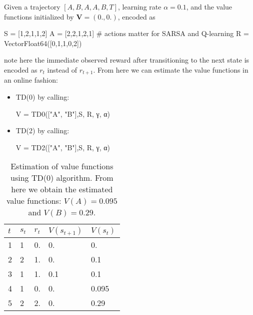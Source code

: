 \documentclass[12pt]{article}
\begin{document}
Given a trajectory $[A,B,A,A,B,T]$, learning rate $\alpha=0.1$, and the value functions initialized by $\mathbf{V} = (0. ,0.)$, encoded as
\begin{jllisting}
    S = [1,2,1,1,2]
    A = [2,2,1,2,1] # actions matter for SARSA and Q-learning
    R = Vector{Float64}([0,1,1,0,2])
\end{jllisting}
note here the immediate observed reward after transitioning to the next state is encoded as $r_{t}$ instead of $r_{t+1}$.
From here we can estimate the value functions in an online fashion:
\begin{itemize}
    \item TD(0) by calling:
    \begin{jllisting}
        V = TD0(["A", "B"],S, R, γ, α)
    \end{jllisting}
    \item TD(2) by calling:
    \begin{jllisting}
        V = TD2(["A", "B"],S, R, γ, α)
    \end{jllisting}
\end{itemize}
\begin{table}[H]
    \centering
    \caption{Estimation of value functions using TD(0) algorithm. From here we obtain the estimated value functions: $V(A) = 0.095$ and $V(B) = 0.29$.}
    \label{tab:TD0}
    \begin{tabular}{|l|l|l|l|l|}
    \hline
    $t$ & $s_{t}$ & $r_{t}$ & $V(s_{t+1})$ & $V(s_t)$ \\ \hline
    1   & 1       & 0.      & 0.           & 0.       \\ \hline
    2   & 2       & 1.      & 0.           & 0.1      \\ \hline
    3   & 1       & 1.      & 0.1          & 0.1      \\ \hline
    4   & 1       & 0.      & 0.           & 0.095    \\ \hline
    5   & 2       & 2.      & 0.           & 0.29     \\ \hline
    \end{tabular}
\end{table}
\end{document}
